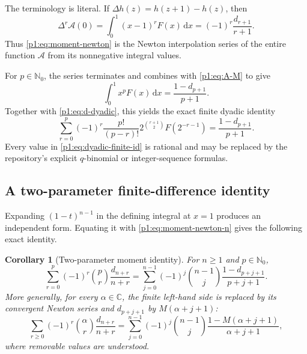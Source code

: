 \documentclass[11pt,oneside]{article}
\newtheorem{corollary}[theorem]{Corollary}
\theoremstyle{definition}
\theoremstyle{remark}
\newcommand{\C}{\mathbb C}
\newcommand{\N}{\mathbb N}
\newcommand{\dd}{\,\mathrm d}
\newcommand{\1}{\mathbf 1}
\begin{document}
The terminology is literal.  If \(\Delta h(z)=h(z+1)-h(z)\), then
\begin{equation}
 \Delta^r\mathcal A(0)
 =\int_0^1(x-1)^rF(x)\dd x
 =(-1)^r\frac{d_{r+1}}{r+1}.                                  \label{p1:eq:Newton-difference}
\end{equation}
Thus \eqref{p1:eq:moment-newton} is the Newton interpolation series of the entire
function \(\mathcal A\) from its nonnegative integral values.

For \(p\in\N_0\), the series terminates and combines with \eqref{p1:eq:A-M} to
give
\begin{equation}
 \boxed{\quad
 \int_0^1x^pF(x)\dd x=\frac{1-d_{p+1}}{p+1}.
 \quad}                                                        \label{p1:eq:integer-definite}
\end{equation}
Together with \eqref{p1:eq:d-dyadic}, this yields the exact finite dyadic identity
\begin{equation}
 \sum_{r=0}^{p}(-1)^r\frac{p!}{(p-r)!}
 2^{\binom{r+1}{2}}F(2^{-r-1})
 =\frac{1-d_{p+1}}{p+1}.                                      \label{p1:eq:dyadic-finite-id}
\end{equation}
Every value in \eqref{p1:eq:dyadic-finite-id} is rational and may be replaced by
the repository's explicit \(q\)-binomial or integer-sequence formulas.

\subsection{A two-parameter finite-difference identity}
Expanding \((1-t)^{n-1}\) in the defining integral at \(x=1\) produces an
independent form.  Equating it with \eqref{p1:eq:moment-newton-n} gives the
following exact identity.

\begin{corollary}[Two-parameter moment identity]\label{p1:cor:two-param}
For \(n\geq1\) and \(p\in\N_0\),
\begin{equation}
 \boxed{\quad
 \sum_{r=0}^{p}(-1)^r\binom pr\frac{d_{n+r}}{n+r}
 =\sum_{j=0}^{n-1}(-1)^j\binom{n-1}{j}
 \frac{1-d_{p+j+1}}{p+j+1}.
 \quad}                                                        \label{p1:eq:two-param-id}
\end{equation}
More generally, for every \(\alpha\in\C\), the finite left-hand side is
replaced by its convergent Newton series and \(d_{p+j+1}\) by
\(M(\alpha+j+1)\):
\begin{equation}
 \sum_{r\geq0}(-1)^r\binom\alpha r\frac{d_{n+r}}{n+r}
 =\sum_{j=0}^{n-1}(-1)^j\binom{n-1}{j}
 \frac{1-M(\alpha+j+1)}{\alpha+j+1},                           \label{p1:eq:two-param-entire}
\end{equation}
where removable values are understood.
\end{corollary}
\end{document}
